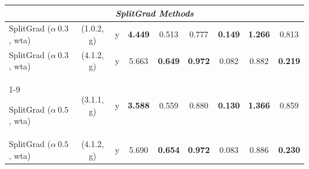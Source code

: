 \begin{longtable}{p{4cm}|cc|cccccc}
    \midrule
    \multicolumn{9}{c}{\textit{SplitGrad Methods}} \\
    \midrule
    SplitGrad ($\alpha\ 0.3$, wta) & (1.0.2, g) & y & \textbf{4.449} & 0.513 & 0.777 & \textbf{0.149} & \textbf{1.266} & 0.813 \\
    SplitGrad ($\alpha\ 0.3$, wta) & (4.1.2, g) & y & 5.663 & \textbf{0.649} & \textbf{0.972} & 0.082 & 0.882 & \textbf{0.219} \\

    \cmidrule(lr){1-9}

    SplitGrad ($\alpha\ 0.5$, wta) & (3.1.1, g) & y & \textbf{3.588} & 0.559 & 0.880 & \textbf{0.130} & \textbf{1.366} & 0.859 \\
    SplitGrad ($\alpha\ 0.5$, wta) & (4.1.2, g) & y & 5.690 & \textbf{0.654} & \textbf{0.972} & 0.083 & 0.886 & \textbf{0.230} \\


\end{longtable}
